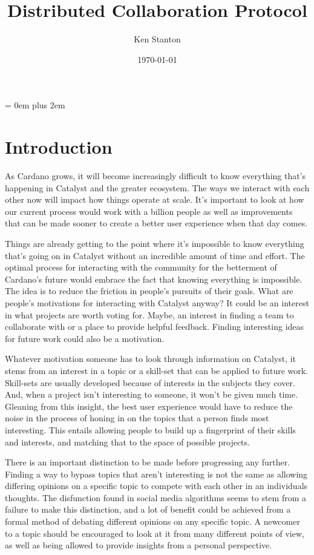 \documentclass[10pt]{article}
\newcommand{\myedge}{\rightskip = 0em plus 2em}
\begin{document}
\title{Distributed Collaboration Protocol}
\author{Ken Stanton}
\date{\today}
\maketitle

\myedge

\setcounter{tocdepth}{1}
\tableofcontents
\newpage


\section{Introduction}
As Cardano grows, it will become increasingly difficult to know everything that's happening in Catalyst and the greater ecosystem.
The ways we interact with each other now will impact how things operate at scale.
It's important to look at how our current process would work with a billion people as well as improvements that can be made sooner to create a better user experience when that day comes.

Things are already getting to the point where it's impossible to know everything that's going on in Catalyst without an incredible amount of time and effort.
The optimal process for interacting with the community for the betterment of Cardano's future would embrace the fact that knowing everything is impossible.
The idea is to reduce the friction in people's pursuits of their goals.
What are people's motivations for interacting with Catalyst anyway?
It could be an interest in what projects are worth voting for.
Maybe, an interest in finding a team to collaborate with or a place to provide helpful feedback.
Finding interesting ideas for future work could also be a motivation.

Whatever motivation someone has to look through information on Catalyst, it stems from an interest in a topic or a skill-set that can be applied to future work.
Skill-sets are usually developed because of interests in the subjects they cover.
And, when a project isn't interesting to someone, it won't be given much time.
Gleaning from this insight, the best user experience would have to reduce the noise in the process of honing in on the topics that a person finds most interesting.
This entails allowing people to build up a fingerprint of their skills and interests, and matching that to the space of possible projects.

There is an important distinction to be made before progressing any further.
Finding a way to bypass topics that aren't interesting is not the same as allowing differing opinions on a specific topic to compete with each other in an individuals thoughts.
The disfunction found in social media algorithms seems to stem from a failure to make this distinction, and a lot of benefit could be achieved from a formal method of debating different opinions on any specific topic. 
A newcomer to a topic should be encouraged to look at it from many different points of view, as well as being allowed to provide insights from a personal perspective.
\end{document}
